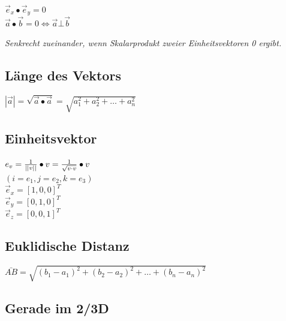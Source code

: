 $\vec{e}_x \bullet \vec{e}_y = 0$ \\
$\vec{a} \bullet \vec{b} = 0 \Leftrightarrow \vec{a} \bot \vec{b}$

\textit{
    Senkrecht zueinander, wenn Skalarprodukt zweier Einheitsvektoren 0 ergibt.
}

\subsection{Länge des Vektors}

$|\vec{a}| = \sqrt{\vec{a} \bullet \vec{a}} = \sqrt{a_1^2 + a_2^2 + \dots + a_n^2}$

\subsection{Einheitsvektor}

$ e_v = \frac{1}{\lvert\lvert v \rvert\rvert} \bullet v = \frac{1}{\sqrt{v \cdot v}} \bullet v$ \\
$ ( i = e_1, j = e_2, k = e_3 ) $ \\

\textit{$\vec{e}_x = [1,0,0]^T$}\\
\textit{$\vec{e}_y = [0,1,0]^T$}\\
\textit{$\vec{e}_z = [0,0,1]^T$}

\subsection{Euklidische Distanz}

$\bar{AB} = \sqrt{(b_1-a_1)^2 + (b_2 - a_2)^2 + \dots + (b_n - a_n)^2}$

\subsection{Gerade im 2/3D}

